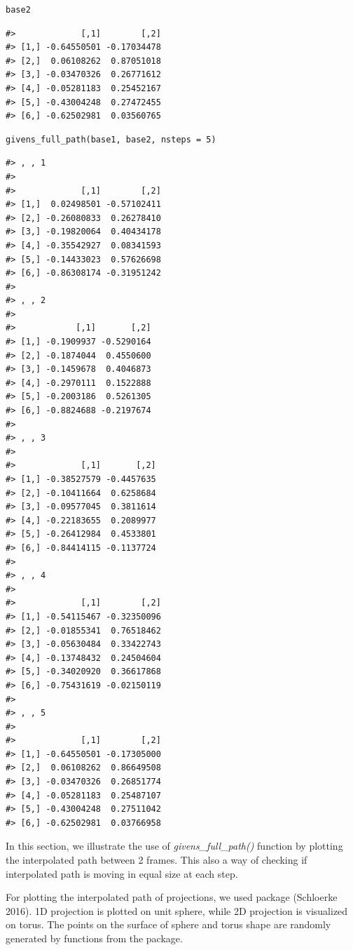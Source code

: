 \begin{verbatim}
base2
\end{verbatim}

\begin{verbatim}
#>             [,1]        [,2]
#> [1,] -0.64550501 -0.17034478
#> [2,]  0.06108262  0.87051018
#> [3,] -0.03470326  0.26771612
#> [4,] -0.05281183  0.25452167
#> [5,] -0.43004248  0.27472455
#> [6,] -0.62502981  0.03560765
\end{verbatim}

\begin{verbatim}
givens_full_path(base1, base2, nsteps = 5)
\end{verbatim}

\begin{verbatim}
#> , , 1
#> 
#>             [,1]        [,2]
#> [1,]  0.02498501 -0.57102411
#> [2,] -0.26080833  0.26278410
#> [3,] -0.19820064  0.40434178
#> [4,] -0.35542927  0.08341593
#> [5,] -0.14433023  0.57626698
#> [6,] -0.86308174 -0.31951242
#> 
#> , , 2
#> 
#>            [,1]       [,2]
#> [1,] -0.1909937 -0.5290164
#> [2,] -0.1874044  0.4550600
#> [3,] -0.1459678  0.4046873
#> [4,] -0.2970111  0.1522888
#> [5,] -0.2003186  0.5261305
#> [6,] -0.8824688 -0.2197674
#> 
#> , , 3
#> 
#>             [,1]       [,2]
#> [1,] -0.38527579 -0.4457635
#> [2,] -0.10411664  0.6258684
#> [3,] -0.09577045  0.3811614
#> [4,] -0.22183655  0.2089977
#> [5,] -0.26412984  0.4533801
#> [6,] -0.84414115 -0.1137724
#> 
#> , , 4
#> 
#>             [,1]        [,2]
#> [1,] -0.54115467 -0.32350096
#> [2,] -0.01855341  0.76518462
#> [3,] -0.05630484  0.33422743
#> [4,] -0.13748432  0.24504604
#> [5,] -0.34020920  0.36617868
#> [6,] -0.75431619 -0.02150119
#> 
#> , , 5
#> 
#>             [,1]        [,2]
#> [1,] -0.64550501 -0.17305000
#> [2,]  0.06108262  0.86649508
#> [3,] -0.03470326  0.26851774
#> [4,] -0.05281183  0.25487107
#> [5,] -0.43004248  0.27511042
#> [6,] -0.62502981  0.03766958
\end{verbatim}

In this section, we illustrate the use of \emph{givens\_full\_path()} function by plotting the interpolated path between 2 frames. This also a way of checking if interpolated path is moving in equal size at each step.

For plotting the interpolated path of projections, we used  package (Schloerke 2016). 1D projection is plotted on unit sphere, while 2D projection is visualized on torus. The points on the surface of sphere and torus shape are randomly generated by functions from the  package.

